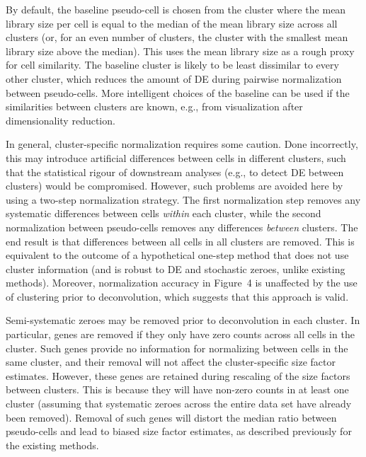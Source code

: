 \documentclass{article}
\newcommand{\figdeconv}{4}
\begin{document}

By default, the baseline pseudo-cell is chosen from the cluster where the mean library size per cell is equal to the median of the mean library size across all clusters
    (or, for an even number of clusters, the cluster with the smallest mean library size above the median).
This uses the mean library size as a rough proxy for cell similarity.
The baseline cluster is likely to be least dissimilar to every other cluster, which reduces the amount of DE during pairwise normalization between pseudo-cells.
More intelligent choices of the baseline can be used if the similarities between clusters are known, e.g., from visualization after dimensionality reduction.

In general, cluster-specific normalization requires some caution.
Done incorrectly, this may introduce artificial differences between cells in different clusters, 
    such that the statistical rigour of downstream analyses (e.g., to detect DE between clusters) would be compromised.
However, such problems are avoided here by using a two-step normalization strategy.
The first normalization step removes any systematic differences between cells \textit{within} each cluster, 
    while the second normalization between pseudo-cells removes any differences \textit{between} clusters.
The end result is that differences between all cells in all clusters are removed.
This is equivalent to the outcome of a hypothetical one-step method that does not use cluster information (and is robust to DE and stochastic zeroes, unlike existing methods).
Moreover, normalization accuracy in Figure~\figdeconv{} is unaffected by the use of clustering prior to deconvolution, which suggests that this approach is valid.

Semi-systematic zeroes may be removed prior to deconvolution in each cluster.
In particular, genes are removed if they only have zero counts across all cells in the cluster.
Such genes provide no information for normalizing between cells in the same cluster, and their removal will not affect the cluster-specific size factor estimates.
However, these genes are retained during rescaling of the size factors between clusters.
This is because they will have non-zero counts in at least one cluster (assuming that systematic zeroes across the entire data set have already been removed).
Removal of such genes will distort the median ratio between pseudo-cells and lead to biased size factor estimates, as described previously for the existing methods.
\end{document}
